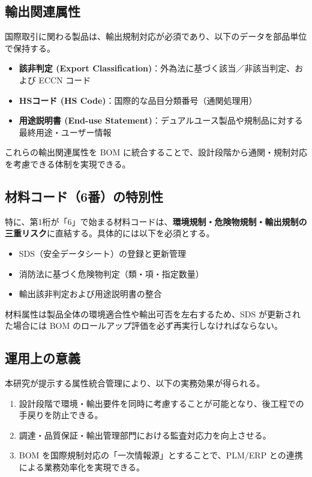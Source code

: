 \documentclass[10pt,conference]{IEEEtran}
\begin{document}
\subsection{輸出関連属性}
国際取引に関わる製品は、輸出規制対応が必須であり、以下のデータを部品単位で保持する。
\begin{itemize}
  \item \textbf{該非判定 (Export Classification)}：外為法に基づく該当／非該当判定、および ECCN コード
  \item \textbf{HSコード (HS Code)}：国際的な品目分類番号（通関処理用）
  \item \textbf{用途説明書 (End-use Statement)}：デュアルユース製品や規制品に対する最終用途・ユーザー情報
\end{itemize}

これらの輸出関連属性を BOM に統合することで、設計段階から通関・規制対応を考慮できる体制を実現できる。

\subsection{材料コード（6番）の特別性}
特に、第1桁が「6」で始まる材料コードは、\textbf{環境規制・危険物規制・輸出規制の三重リスク}に直結する。具体的には以下を必須とする。
\begin{itemize}
  \item SDS（安全データシート）の登録と更新管理
  \item 消防法に基づく危険物判定（類・項・指定数量）
  \item 輸出該非判定および用途説明書の整合
\end{itemize}
材料属性は製品全体の環境適合性や輸出可否を左右するため、SDS が更新された場合には BOM のロールアップ評価を必ず再実行しなければならない。

\subsection{運用上の意義}
本研究が提示する属性統合管理により、以下の実務効果が得られる。
\begin{enumerate}
  \item 設計段階で環境・輸出要件を同時に考慮することが可能となり、後工程での手戻りを防止できる。
  \item 調達・品質保証・輸出管理部門における監査対応力を向上させる。
  \item BOM を国際規制対応の「一次情報源」とすることで、PLM/ERP との連携による業務効率化を実現できる。
\end{enumerate}
\end{document}
